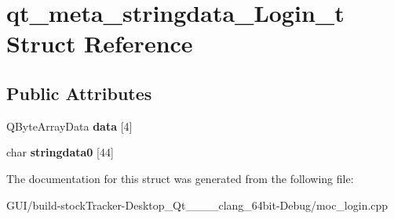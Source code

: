 \hypertarget{structqt__meta__stringdata___login__t}{}\section{qt\+\_\+meta\+\_\+stringdata\+\_\+\+Login\+\_\+t Struct Reference}
\label{structqt__meta__stringdata___login__t}
\subsection*{Public Attributes}
\begin{DoxyCompactItemize}
\item 
\mbox{\label{structqt__meta__stringdata___login__t_a19d59314c23cd60d197769e2dad65654}} 
Q\+Byte\+Array\+Data {\bfseries data} \mbox{[}4\mbox{]}
\item 
\mbox{\label{structqt__meta__stringdata___login__t_ad6ac3dab052ae70d00a28a0b2abf568e}} 
char {\bfseries stringdata0} \mbox{[}44\mbox{]}
\end{DoxyCompactItemize}


The documentation for this struct was generated from the following file\+:\begin{DoxyCompactItemize}
\item 
G\+U\+I/build-\/stock\+Tracker-\/\+Desktop\+\_\+\+Qt\+\_\+\_\+\_\+\_\+clang\+\_\+64bit-\/\+Debug/moc\+\_\+login.\+cpp\end{DoxyCompactItemize}
